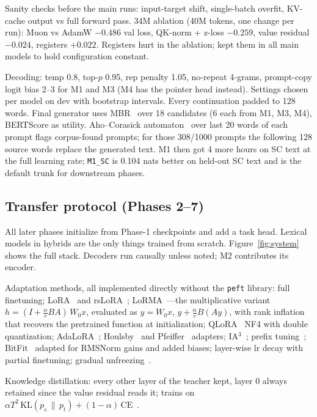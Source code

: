\documentclass[11pt, oneside]{article}
\begin{document}
Sanity checks before the main runs: input-target shift, single-batch overfit, KV-cache output vs full
forward pass. 34M ablation (40M tokens, one change per run): Muon vs AdamW $-0.486$ val loss, QK-norm +
z-loss $-0.259$, value residual $-0.024$, registers $+0.022$. Registers hurt in the ablation; kept them
in all main models to hold configuration constant.

Decoding: temp 0.8, top-$p$ 0.95, rep penalty 1.05, no-repeat 4-grams, prompt-copy logit bias 2--3 for
M1 and M3 (M4 has the pointer head instead). Settings chosen per model on dev with bootstrap intervals.
Every continuation padded to 128 words. Final generator uses MBR~\citep{kumar2004mbr} over 18 candidates
(6 each from M1, M3, M4), BERTScore as utility. Aho--Corasick automaton~\citep{aho1975efficient} over
last 20 words of each prompt flags corpus-found prompts; for those 308/1000 prompts the following 128
source words replace the generated text. M1 then got 4 more hours on SC text at the full learning rate;
\texttt{M1\_SC} is 0.104 nats better on held-out SC text and is the default trunk for downstream phases.

\subsection{Transfer protocol (Phases 2--7)}
All later phases initialize from Phase-1 checkpoints and add a task head. Lexical models in hybrids are
the only things trained from scratch. Figure~\ref{fig:system} shows the full stack. Decoders run
causally unless noted; M2 contributes its encoder.

Adaptation methods, all implemented directly without the \texttt{peft} library: full finetuning;
LoRA~\citep{hu2022lora} and rsLoRA~\citep{kalajdzievski2023rslora}; LoRMA~\citep{bihany2025lorma}---the
multiplicative variant $h = (I + \tfrac{\alpha}{r}BA)\,W_0 x$, evaluated as $y = W_0x$,
$y + \tfrac{\alpha}{r}B(Ay)$, with rank inflation that recovers the pretrained function at
initialization; QLoRA~\citep{dettmers2023qlora} NF4 with double quantization;
AdaLoRA~\citep{zhang2023adalora}; Houlsby~\citep{houlsby2019adapters} and
Pfeiffer~\citep{pfeiffer2021adapterfusion} adapters; IA$^3$~\citep{liu2022ia3}; prefix
tuning~\citep{li2021prefix}; BitFit~\citep{benzaken2022bitfit} adapted for RMSNorm gains and added
biases; layer-wise lr decay with partial finetuning; gradual unfreezing~\citep{howard2018ulmfit}.

Knowledge distillation: every other layer of the teacher kept, layer 0 always retained since the value
residual reads it; trains on $\alpha T^2\,\mathrm{KL}(p_s \,\|\, p_t) + (1-\alpha)\,\mathrm{CE}$~\citep{hinton2015distilling,sanh2019distilbert}.
\end{document}
